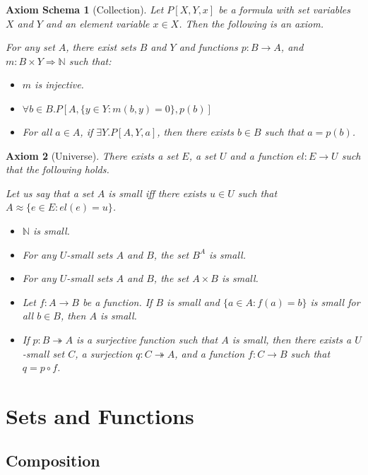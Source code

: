\documentclass{book}
\newtheorem{ax}{Axiom}[section]
\newtheorem{axs}[ax]{Axiom Schema}
\theoremstyle{definition}
\begin{document}
\begin{axs}[Collection]
Let $P[X,Y,x]$ be a formula with set variables $X$ and $Y$ and an element variable $x \in X$. Then the following is an axiom.

For any set $A$, there exist sets $B$ and $Y$ and functions $p : B \rightarrow A$, and $m : B \times Y \Rightarrow \mathbb{N}$ such that:
\begin{itemize}
\item $m$ is injective.
\item $\forall b \in B. P[A, \{ y \in Y : m(b,y) = 0 \}, p(b)]$
\item For all $a \in A$, if $\exists Y. P[A,Y,a]$, then there exists $b \in B$ such that $a = p(b)$.
\end{itemize}
\end{axs}

\begin{ax}[Universe]
There exists a set $E$, a set $U$ and a function $el : E \rightarrow U$ such that the following holds.

Let us say that a set $A$ is \emph{small} iff there exists $u \in U$ such that $A \approx \{ e \in E : el(e) = u \}$.

\begin{itemize}
\item $\mathbb{N}$ is small.
\item For any $U$-small sets $A$ and $B$, the set $B^A$ is small.
\item For any $U$-small sets $A$ and $B$, the set $A \times B$ is small.
\item Let $f : A \rightarrow B$ be a function. If $B$ is small and $\{ a \in A : f(a) = b \}$ is small for all $b \in B$, then $A$ is small.
\item If $p : B \twoheadrightarrow A$ is a surjective function such that $A$ is small, then there exists a $U$-small set $C$, a surjection $q : C \twoheadrightarrow A$, and a function $f : C \rightarrow B$ such that $q = p \circ f$.
\end{itemize}
\end{ax}

\chapter{Sets and Functions}

\section{Composition}
\end{document}

